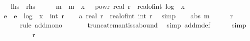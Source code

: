 \begin{isabellebody}
\ \ {\isacharparenleft}{\kern0pt}\ {\isachardoublequoteopen}{\isacharquery}{\kern0pt}lhs\ {\isasymle}\ {\isacharquery}{\kern0pt}rhs{\isachardoublequoteclose}{\isacharparenright}{\kern0pt}\isanewline
%
\isadelimproof
%
\endisadelimproof
%
\isatagproof
{}\isamarkupfalse%
\ {\isacharminus}{\kern0pt}\isanewline
\ \ \isamarkupfalse%
\ m\ \ {\isachardoublequoteopen}m\ {\isacharequal}{\kern0pt}\ {\isasymlfloor}x\ {\isacharasterisk}{\kern0pt}\ {}\ powr\ {\isacharparenleft}{\kern0pt}real\ r\ {\isacharminus}{\kern0pt}\ real{\isacharunderscore}{\kern0pt}of{\isacharunderscore}{\kern0pt}int\ {\isasymlfloor}log\ {}\ {\isasymbar}x{\isasymbar}{\isasymrfloor}{\isacharparenright}{\kern0pt}{\isasymrfloor}{\isachardoublequoteclose}\isanewline
\ \ \isamarkupfalse%
\ e\ \ {\isachardoublequoteopen}e\ {\isacharequal}{\kern0pt}\ {\isasymlfloor}log\ {}\ {\isasymbar}x{\isasymbar}{\isasymrfloor}\ {\isacharminus}{\kern0pt}\ int\ r{\isachardoublequoteclose}\isanewline
\isanewline
\ \ \isamarkupfalse%
\ a{\isacharcolon}{\kern0pt}\ {\isachardoublequoteopen}real\ r\ {\isacharequal}{\kern0pt}\ real{\isacharunderscore}{\kern0pt}of{\isacharunderscore}{\kern0pt}int\ {\isacharparenleft}{\kern0pt}int\ r{\isacharparenright}{\kern0pt}{\isachardoublequoteclose}\ \isamarkupfalse%
\ simp\isanewline
\ \ \isamarkupfalse%
\ {\isachardoublequoteopen}abs\ m\ {\isacharplus}{\kern0pt}\ {}\ {\isasymle}\ {}\ {\isacharcircum}{\kern0pt}\ {\isacharparenleft}{\kern0pt}r\ {\isacharplus}{\kern0pt}\ {}{\isacharparenright}{\kern0pt}\ {\isacharplus}{\kern0pt}\ {}{\isacharcircum}{\kern0pt}{}{\isachardoublequoteclose}\isanewline
\ \ \ \ \isamarkupfalse%
\ {\isacharparenleft}{\kern0pt}rule\ add{\isacharunderscore}{\kern0pt}mono{\isacharparenright}{\kern0pt}\isanewline
\ \ \ \ \ \isamarkupfalse%
\ truncate{\isacharunderscore}{\kern0pt}mantissa{\isacharunderscore}{\kern0pt}bound\ \isamarkupfalse%
\ {\isacharparenleft}{\kern0pt}simp\ add{\isacharcolon}{\kern0pt}m{\isacharunderscore}{\kern0pt}def{\isacharparenright}{\kern0pt}\isanewline
\ \ \ \ \isamarkupfalse%
\ simp\isanewline
\ \ \isamarkupfalse%
\ \isamarkupfalse%
\ {\isachardoublequoteopen}{\isachardot}{\kern0pt}{\isachardot}{\kern0pt}{\isachardot}{\kern0pt}\ {\isasymle}\ {}\ {\isacharcircum}{\kern0pt}\ {\isacharparenleft}{\kern0pt}r{\isacharplus}{\kern0pt}{}{\isacharparenright}{\kern0pt}{\isachardoublequoteclose}\isanewline

\end{isabellebody}
